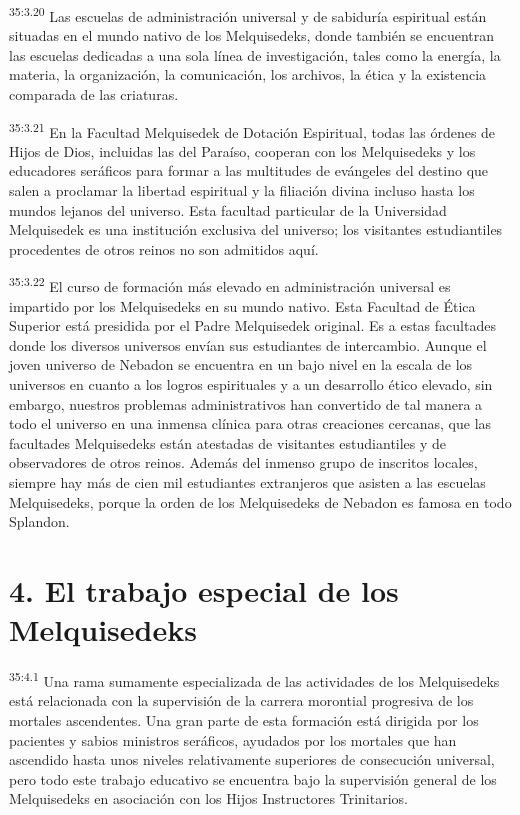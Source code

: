 \par
\textsuperscript{35:3.20} Las escuelas de administración universal y de sabiduría espiritual están situadas en el mundo nativo de los Melquisedeks, donde también se encuentran las escuelas dedicadas a una sola línea de investigación, tales como la energía, la materia, la organización, la comunicación, los archivos, la ética y la existencia comparada de las criaturas.

\par
\textsuperscript{35:3.21} En la Facultad Melquisedek de Dotación Espiritual, todas las órdenes de Hijos de Dios, incluidas las del Paraíso, cooperan con los Melquisedeks y los educadores seráficos para formar a las multitudes de evángeles del destino que salen a proclamar la libertad espiritual y la filiación divina incluso hasta los mundos lejanos del universo. Esta facultad particular de la Universidad Melquisedek es una institución exclusiva del universo; los visitantes estudiantiles procedentes de otros reinos no son admitidos aquí.

\par
\textsuperscript{35:3.22} El curso de formación más elevado en administración universal es impartido por los Melquisedeks en su mundo nativo. Esta Facultad de Ética Superior está presidida por el Padre Melquisedek original. Es a estas facultades donde los diversos universos envían sus estudiantes de intercambio. Aunque el joven universo de Nebadon se encuentra en un bajo nivel en la escala de los universos en cuanto a los logros espirituales y a un desarrollo ético elevado, sin embargo, nuestros problemas administrativos han convertido de tal manera a todo el universo en una inmensa clínica para otras creaciones cercanas, que las facultades Melquisedeks están atestadas de visitantes estudiantiles y de observadores de otros reinos. Además del inmenso grupo de inscritos locales, siempre hay más de cien mil estudiantes extranjeros que asisten a las escuelas Melquisedeks, porque la orden de los Melquisedeks de Nebadon es famosa en todo Splandon.

\section*{4. El trabajo especial de los Melquisedeks}
\par
\textsuperscript{35:4.1} Una rama sumamente especializada de las actividades de los Melquisedeks está relacionada con la supervisión de la carrera morontial progresiva de los mortales ascendentes. Una gran parte de esta formación está dirigida por los pacientes y sabios ministros seráficos, ayudados por los mortales que han ascendido hasta unos niveles relativamente superiores de consecución universal, pero todo este trabajo educativo se encuentra bajo la supervisión general de los Melquisedeks en asociación con los Hijos Instructores Trinitarios.

